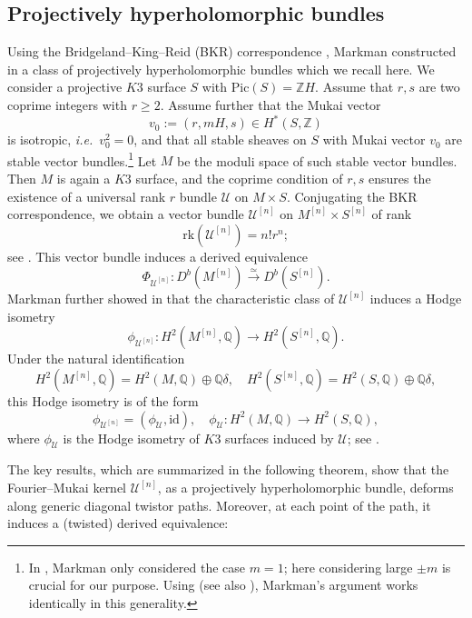 \documentclass[11pt]{amsart}
\theoremstyle{plain}
\theoremstyle{definition}
\theoremstyle{remark}
\newcommand{\BQ}{{\mathbb{Q}}}
\newcommand{\BZ}{{\mathbb{Z}}}
\newcommand{\CU}{{\mathcal U}}
\newcommand{\CX}{{\mathcal X}}
\newcommand{\FM}{{\mathfrak{M}}}
\begin{document}
\subsection{Projectively hyperholomorphic bundles}\label{Section1.3}
Using the Bridgeland--King--Reid (BKR) correspondence \cite{BKR}, Markman constructed in \cite{Markman} a class of projectively hyperholomorphic bundles which we recall here. We consider a projective $K3$ surface $S$ with $\mathrm{Pic}(S)=\BZ H$. Assume that $r,s$ are two coprime integers with $r\geq 2$. Assume further that the Mukai vector
\[
v_0:=(r, mH, s) \in H^*(S, \BZ)
\]
is isotropic, \emph{i.e.}~$v_0^2=0$, and that all stable sheaves on $S$ with Mukai vector $v_0$ are stable vector bundles.\footnote{In \cite{Markman}, Markman only considered the case $m=1$; here considering large $\pm m$ is crucial for our purpose. Using \cite[Proposition 2.2]{H2} (see also \cite[Theorem 2.2]{Y}), Markman's argument works identically in this generality.} Let $M$ be the moduli space of such stable vector bundles. Then $M$ is again a $K3$ surface, and the coprime condition of $r, s$ ensures the existence of a universal rank $r$ bundle $\CU$ on $M \times S$. Conjugating the BKR correspondence, we obtain a vector bundle $\CU^{[n]}$ on $M^{[n]} \times S^{[n]}$ of rank
\[
\mathrm{rk}(\CU^{[n]}) = n!r^n;
\]
see \cite[Lemma 7.1]{Markman}. This vector bundle induces a derived equivalence
\begin{equation}\label{Deq}
\Phi_{\CU^{[n]}}: D^b(M^{[n]}) \xrightarrow{\simeq} D^b(S^{[n]}).
\end{equation}
Markman further showed in \cite[Section 5.6]{Markman} that the characteristic class of $\CU^{[n]}$ induces a Hodge isometry
\[
\phi_{\CU^{[n]}}: H^2(M^{[n]}, \BQ) \to H^2(S^{[n]}, \BQ). 
\]
Under the natural identification
\begin{equation}\label{Hilb}
H^2(M^{[n]}, \BQ) = H^2(M, \BQ)\oplus \BQ \delta, \quad H^2(S^{[n]}, \BQ) = H^2(S, \BQ)\oplus \BQ  \delta,
\end{equation}
this Hodge isometry is of the form
\[
\phi_{\CU^{[n]}} =  (\phi_\CU, \mathrm{id}), \quad \phi_\CU : H^2(M, \BQ) \to H^2(S, \BQ),
\]
where $\phi_\CU$ is the Hodge isometry of $K3$ surfaces induced by $\CU$; see \cite[Corollary 7.3]{Markman}.

The key results, which are summarized in the following theorem, show that the Fourier--Mukai kernel $\CU^{[n]}$, as a projectively hyperholomorphic bundle, deforms along generic diagonal twistor paths. Moreover, at each point of the path, it induces a (twisted) derived equivalence:
\end{document}
